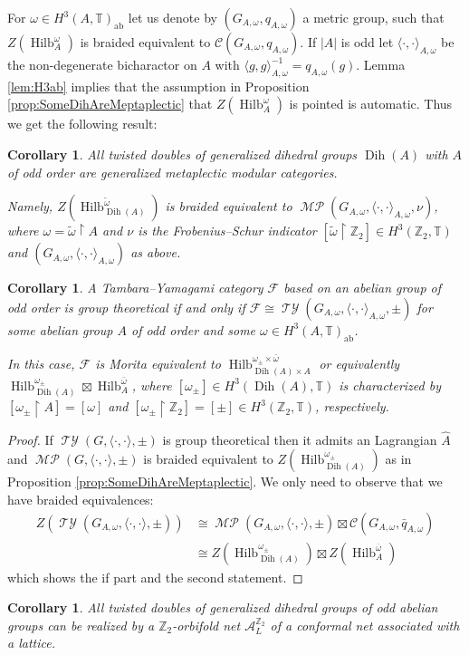 \documentclass[twoside,11pt,reqno]{amsart}
\newtheorem{cor}[thm]{Corollary}
\theoremstyle{definition}
\theoremstyle{remark}
\newcommand{\cF}{\mathcal{F}}
\newcommand{\cC}{\mathcal{C}}
\newcommand{\A}{\mathcal{A}}
\newcommand{\TT}{\mathbb{T}}
\newcommand{\ZZ}{\mathbb{Z}}
\DeclareMathOperator{\Dih}{Dih}
\DeclareMathOperator*{\TY}{\mathcal{TY}}
\DeclareMathOperator*{\MP}{\mathcal{MP}}
\DeclareMathOperator{\Vect}{Hilb}
\newcommand{\bi}[2]{\langle #1,#2\rangle}
\newcommand{\bislotslot}{\bi\cdot\cdot}
\begin{document}
For $\omega\in H^3(A,\TT)_\mathrm{ab}$ let us denote by $(G_{A,\omega},q_{A,\omega})$ a metric group, such that 
$Z(\Vect_A^\omega)$ is braided equivalent to $\cC(G_{A,\omega},q_{A,\omega})$. If $|A|$ is odd let 
$\bislotslot_{A,\omega}$ be the non-degenerate bicharactor on $A$ with $\bi gg_{A,\omega}^{-1}=q_{A,\omega}(g)$. 
Lemma \ref{lem:H3ab} implies that the assumption in Proposition 
\ref{prop:SomeDihAreMeptaplectic} that $Z(\Vect^\omega_A)$ is pointed is 
automatic. 
Thus we get the following result:
\begin{cor} 
  All twisted doubles of generalized dihedral groups $\Dih(A)$ with $A$ of odd 
  order are generalized metaplectic modular categories.
  
  Namely, $Z(\Vect_{\Dih(A)}^{\tilde\omega})$ is braided equivalent to 
  $\MP(G_{A,\omega},\bislotslot_{A,\omega},\nu)$, where 
  $\omega=\tilde\omega\restriction A$ and $\nu$ is the Frobenius--Schur 
  indicator
  $[\tilde\omega\restriction \ZZ_2]\in H^3(\ZZ_2,\TT)$ and 
  $(G_{A,\omega},\bislotslot_{A,\omega})$ as above.
\end{cor}
%
%
%
\begin{cor}
  A  Tambara--Yamagami category $\cF$ based on an abelian group  of odd order
  is group theoretical 
  if and only if $\cF\cong \TY(G_{A,\omega},\bislotslot_{A,\omega},\pm)$
  for some abelian group $A$ of odd order and some
  $\omega\in H^3(A,\TT)_\mathrm{ab}$.

  In this case, $\cF$ is Morita equivalent to 
  $\Vect^{\omega_\pm\times \bar\omega}_{\Dih(A)\times A}$ or equivalently
  $\Vect^{\omega_\pm}_{\Dih(A)}\boxtimes\Vect^{\bar\omega}_A$,
  where $[\omega_\pm]\in H^3(\Dih(A),\TT)$ is characterized by
  $[\omega_\pm\restriction A]=[\omega]$ and 
  $[\omega_\pm\restriction \ZZ_2]=[\pm]\in H^3(\ZZ_2,\TT)$, respectively.
\end{cor}
\begin{proof} 
  If $\TY(G,\bislotslot,\pm)$ is group theoretical then it admits an Lagrangian
  $\hat A$ and $\MP(G,\bislotslot,\pm)$ is braided equivalent to 
  $Z(\Vect^{\omega_\pm}_{\Dih(A)})$ as in 
    Proposition \ref{prop:SomeDihAreMeptaplectic}. 
  We only need to observe that we have braided equivalences: 
  \begin{align}
    Z(\TY(G_{A,\omega},\bislotslot,\pm)) 
      &\cong
    \MP(G_{A,\omega},\bislotslot,\pm)\boxtimes 
      \cC(G_{A,\omega},\bar q_{A,\omega})\\&\cong
    Z(\Vect^{\omega_\pm}_{\Dih(A)})\boxtimes Z(\Vect^{\overline\omega}_A)
  \end{align}
  which shows the if part and the second statement.
\end{proof}
\begin{cor}
  All twisted doubles of generalized dihedral groups of odd abelian groups 
  can be realized by a $\ZZ_2$-orbifold net $\A_L^{\ZZ_2}$ of a conformal net
  associated with a lattice.
\end{cor}
\end{document}

